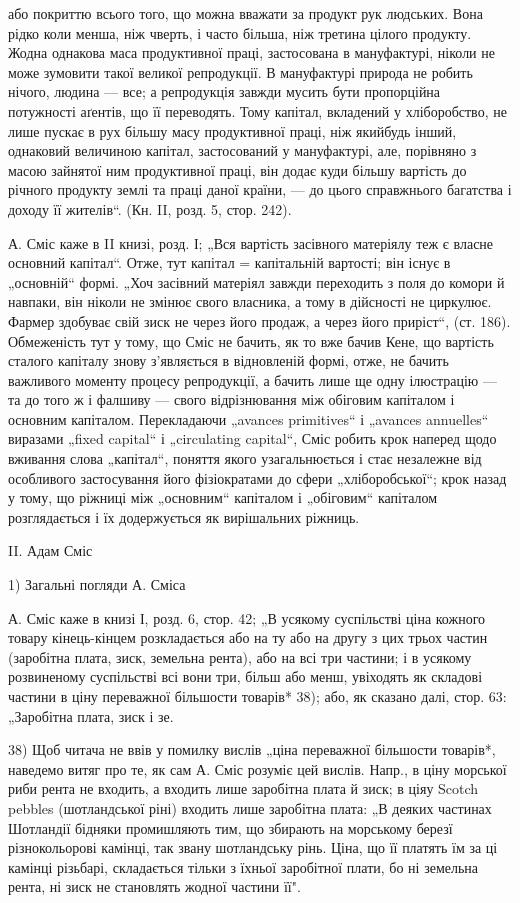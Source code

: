 або покриттю всього того, що можна вважати за продукт рук людських.
Вона рідко коли менша, ніж чверть, і часто більша, ніж третина цілого
продукту. Жодна однакова маса продуктивної праці, застосована в мануфактурі,
ніколи не може зумовити такої великої репродукції. В мануфактурі
природа не робить нічого, людина — все; а репродукція завжди
мусить бути пропорційна потужності аґентів, що її переводять. Тому
капітал, вкладений у хліборобство, не лише пускає в рух більшу масу
продуктивної праці, ніж якийбудь інший, однаковий величиною капітал,
застосований у мануфактурі, але, порівняно з масою зайнятої ним продуктивної
праці, він додає куди більшу вартість до річного продукту
землі та праці даної країни, — до цього справжнього багатства і доходу
її жителів“. (Кн. II, розд. 5, стор. 242).

А. Сміс каже в II книзі, розд. І; „Вся вартість засівного матеріялу
теж є власне основний капітал“. Отже, тут капітал = капітальній вартості;
він існує в „основній“ формі. „Хоч засівний матеріял завжди переходить
з поля до комори й навпаки, він ніколи не змінює свого власника, а тому
в дійсності не циркулює. Фармер здобуває свій зиск не через його продаж,
а через його приріст“, (ст. 186). Обмеженість тут у тому, що Сміс
не бачить, як то вже бачив Кене, що вартість сталого капіталу знову
з’являється в відновленій формі, отже, не бачить важливого моменту
процесу репродукції, а бачить лише ще одну ілюстрацію — та до того ж
і фалшиву — свого відрізнювання між обіговим капіталом і основним
капіталом. Перекладаючи „avances primitives“ і „avances annuelles“
виразами „fixed capital“ і „circulating capital“, Сміс робить крок наперед
щодо вживання слова „капітал“, поняття якого узагальнюється і стає
незалежне від особливого застосування його фізіократами до сфери
„хліборобської“; крок назад у тому, що ріжниці між „основним“ капіталом
і „обіговим“ капіталом розглядається і їх додержується як вирішальних
ріжниць.

II. Адам Сміс

1) Загальні погляди А. Сміса

А. Сміс каже в книзі І, розд. 6, стор. 42; „В усякому суспільстві
ціна кожного товару кінець-кінцем розкладається або на ту або на другу
з цих трьох частин (заробітна плата, зиск, земельна рента), або на всі
три частини; і в усякому розвиненому суспільстві всі вони три, більш
або менш, увіходять як складові частини в ціну переважної більшости
товарів* 38); або, як сказано далі, стор. 63: „Заробітна плата, зиск і зе.

38) Щоб читача не ввів у помилку вислів „ціна переважної більшости товарів*,
наведемо витяг про те, як сам А. Сміс розуміє цей вислів. Напр., в ціну морської
риби рента не входить, а входить лише заробітна плата й зиск; в ціяу Scotch
pebbles (шотландської ріні) входить лише заробітна плата: „В деяких частинах
Шотландії бідняки промишляють тим, що збирають на морському березї різнокольорові
камінці, так звану шотландську рінь. Ціна, що її платять їм за ці камінці
різьбарі, складається тільки з їхньої заробітної плати, бо ні земельна рента, ні
зиск не становлять жодної частини її".
